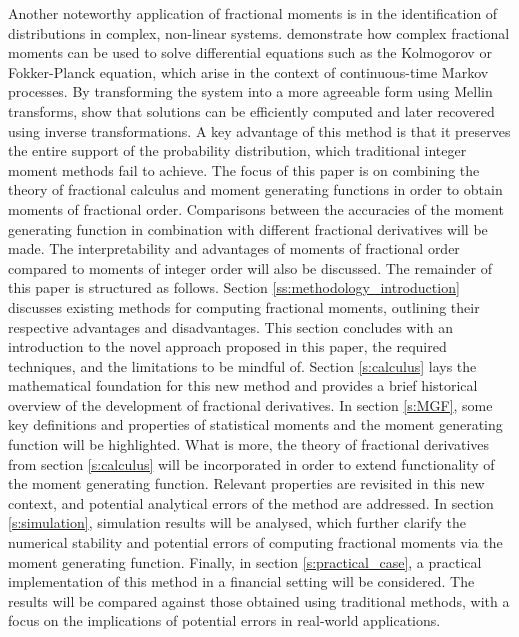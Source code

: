 \newline
Another noteworthy application of fractional moments is in the identification of distributions in complex, non-linear systems. \cite{dimatteo2014} demonstrate how complex fractional moments can be used to solve differential equations such as the Kolmogorov or Fokker-Planck equation, which arise in the context of continuous-time Markov processes.
By transforming the system into a more agreeable form using Mellin transforms, \cite{dimatteo2014} show that solutions can be efficiently computed and later recovered using inverse transformations. A key advantage of this method is that it preserves the entire support of the probability distribution, which traditional integer moment methods fail to achieve.
\newline
The focus of this paper is on combining the theory of fractional calculus and moment generating functions in order to obtain moments of fractional order. Comparisons between the accuracies of the moment generating function in combination with different fractional derivatives will be made. The interpretability and advantages of moments of fractional order compared to moments of integer order will also be discussed. 
The remainder of this paper is structured as follows.
Section \ref{ss:methodology_introduction} discusses existing methods for computing fractional moments, outlining their respective advantages and disadvantages. This section concludes with an introduction to the novel approach proposed in this paper, the required techniques, and the limitations to be mindful of. Section \ref{s:calculus} lays the mathematical foundation for this new method and provides a brief historical overview of the development of fractional derivatives. In section \ref{s:MGF}, some key definitions and properties of statistical moments and the moment generating function will be highlighted. What is more, the theory of fractional derivatives from section \ref{s:calculus} will be incorporated in order to extend functionality of the moment generating function. Relevant properties are revisited in this new context, and potential analytical errors of the method are addressed. In section \ref{s:simulation},  simulation results will be analysed, which further clarify the numerical stability and potential errors of computing fractional moments via the moment generating function. Finally, in section \ref{s:practical_case}, a practical implementation of this method in a financial setting will be considered. The results will be compared against those obtained using traditional methods, with a focus on the implications of potential errors in real-world applications.